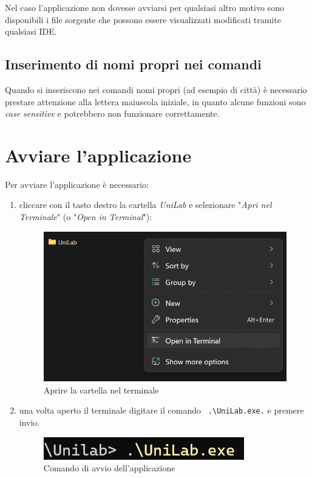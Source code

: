 \documentclass[12pt]{scrreprt}
\begin{document}
		Nel caso l'applicazione non dovesse avviarsi per qualsiasi altro motivo sono disponibili i file sorgente che possono essere visualizzati modificati tramite qualsiasi IDE.

		\subsection{Inserimento di nomi propri nei comandi}
		Quando si inseriscono nei comandi nomi propri (ad esempio di citt\`a) \`e necessario prestare attenzione alla lettera maiuscola iniziale, in quanto alcune funzioni sono \textsl{case sensitive} e potrebbero non funzionare correttamente.

	\section{Avviare l'applicazione}

	Per avviare l'applicazione \`e necessario:
	\begin{enumerate}
		\item cliccare con il tasto destro la cartella \textsl{UniLab} e selezionare "\textsl{Apri nel Terminale}" (o "\textsl{Open in Terminal}"):
		\begin{figure}[H]
			\centering
			\includegraphics[width=0.7\linewidth]{Screen/aprinelterminale}
			\caption{Aprire la cartella nel terminale}
			\label{fig:aprinelterminale}
		\end{figure}
		\item una volta aperto il terminale digitare il comando
		\verb! .\UniLab.exe.! e premere invio.
		\begin{figure}[H]
			\centering
			\includegraphics[width=0.3\linewidth]{Screen/avviocom}
			\caption{Comando di avvio dell'applicazione}
			\label{fig:avviocom}
		\end{figure}
	\end{enumerate}
\end{document}
